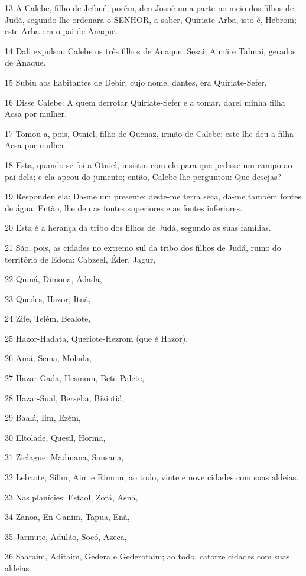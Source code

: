 \par 13 A Calebe, filho de Jefoné, porém, deu Josué uma parte no meio dos filhos de Judá, segundo lhe ordenara o SENHOR, a saber, Quiriate-Arba, isto é, Hebrom; este Arba era o pai de Anaque.
\par 14 Dali expulsou Calebe os três filhos de Anaque: Sesai, Aimã e Talmai, gerados de Anaque.
\par 15 Subiu aos habitantes de Debir, cujo nome, dantes, era Quiriate-Sefer.
\par 16 Disse Calebe: A quem derrotar Quiriate-Sefer e a tomar, darei minha filha Acsa por mulher.
\par 17 Tomou-a, pois, Otniel, filho de Quenaz, irmão de Calebe; este lhe deu a filha Acsa por mulher.
\par 18 Esta, quando se foi a Otniel, insistiu com ele para que pedisse um campo ao pai dela; e ela apeou do jumento; então, Calebe lhe perguntou: Que desejas?
\par 19 Respondeu ela: Dá-me um presente; deste-me terra seca, dá-me também fontes de água. Então, lhe deu as fontes superiores e as fontes inferiores.
\par 20 Esta é a herança da tribo dos filhos de Judá, segundo as suas famílias.
\par 21 São, pois, as cidades no extremo sul da tribo dos filhos de Judá, rumo do território de Edom: Cabzeel, Éder, Jagur,
\par 22 Quiná, Dimona, Adada,
\par 23 Quedes, Hazor, Itnã,
\par 24 Zife, Telém, Bealote,
\par 25 Hazor-Hadata, Queriote-Hezrom (que é Hazor),
\par 26 Amã, Sema, Molada,
\par 27 Hazar-Gada, Hesmom, Bete-Palete,
\par 28 Hazar-Sual, Berseba, Biziotiá,
\par 29 Baalá, Iim, Ezém,
\par 30 Eltolade, Quesil, Horma,
\par 31 Ziclague, Madmana, Sansana,
\par 32 Lebaote, Silim, Aim e Rimom; ao todo, vinte e nove cidades com suas aldeias.
\par 33 Nas planícies: Estaol, Zorá, Asná,
\par 34 Zanoa, En-Ganim, Tapua, Enã,
\par 35 Jarmute, Adulão, Socó, Azeca,
\par 36 Saaraim, Aditaim, Gedera e Gederotaim; ao todo, catorze cidades com suas aldeias.
